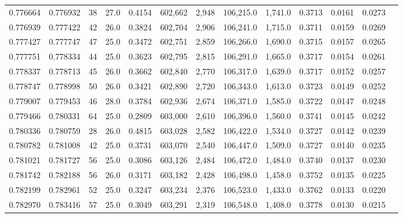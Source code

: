 \begin{tabular}{rrrrrrrrrrrrr}
0.776664 & 0.776932 &    38 & 27.0 &                                     0.4154 & 602,662 &   2,948 & 106,215.0 &   1,741.0 & 0.3713 & 0.0161 & 0.0273 \\
0.776939 & 0.777422 &    42 & 26.0 &                                     0.3824 & 602,704 &   2,906 & 106,241.0 &   1,715.0 & 0.3711 & 0.0159 & 0.0269 \\
0.777427 & 0.777747 &    47 & 25.0 &                                     0.3472 & 602,751 &   2,859 & 106,266.0 &   1,690.0 & 0.3715 & 0.0157 & 0.0265 \\
0.777751 & 0.778334 &    44 & 25.0 &                                     0.3623 & 602,795 &   2,815 & 106,291.0 &   1,665.0 & 0.3717 & 0.0154 & 0.0261 \\
0.778337 & 0.778713 &    45 & 26.0 &                                     0.3662 & 602,840 &   2,770 & 106,317.0 &   1,639.0 & 0.3717 & 0.0152 & 0.0257 \\
0.778747 & 0.778998 &    50 & 26.0 &                                     0.3421 & 602,890 &   2,720 & 106,343.0 &   1,613.0 & 0.3723 & 0.0149 & 0.0252 \\
0.779007 & 0.779453 &    46 & 28.0 &                                     0.3784 & 602,936 &   2,674 & 106,371.0 &   1,585.0 & 0.3722 & 0.0147 & 0.0248 \\
0.779466 & 0.780331 &    64 & 25.0 &                                     0.2809 & 603,000 &   2,610 & 106,396.0 &   1,560.0 & 0.3741 & 0.0145 & 0.0242 \\
0.780336 & 0.780759 &    28 & 26.0 &                                     0.4815 & 603,028 &   2,582 & 106,422.0 &   1,534.0 & 0.3727 & 0.0142 & 0.0239 \\
0.780782 & 0.781008 &    42 & 25.0 &                                     0.3731 & 603,070 &   2,540 & 106,447.0 &   1,509.0 & 0.3727 & 0.0140 & 0.0235 \\
0.781021 & 0.781727 &    56 & 25.0 &                                     0.3086 & 603,126 &   2,484 & 106,472.0 &   1,484.0 & 0.3740 & 0.0137 & 0.0230 \\
0.781742 & 0.782188 &    56 & 26.0 &                                     0.3171 & 603,182 &   2,428 & 106,498.0 &   1,458.0 & 0.3752 & 0.0135 & 0.0225 \\
0.782199 & 0.782961 &    52 & 25.0 &                                     0.3247 & 603,234 &   2,376 & 106,523.0 &   1,433.0 & 0.3762 & 0.0133 & 0.0220 \\
0.782970 & 0.783416 &    57 & 25.0 &                                     0.3049 & 603,291 &   2,319 & 106,548.0 &   1,408.0 & 0.3778 & 0.0130 & 0.0215 \\

\end{tabular}
